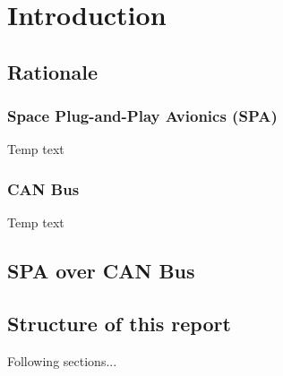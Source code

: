 \section{Introduction}
\subsection{Rationale}
\subsubsection{Space Plug-and-Play Avionics (SPA)}
Temp text
\subsubsection{CAN Bus}
Temp text

\subsection{SPA over CAN Bus}

\subsection{Structure of this report}
Following sections...
